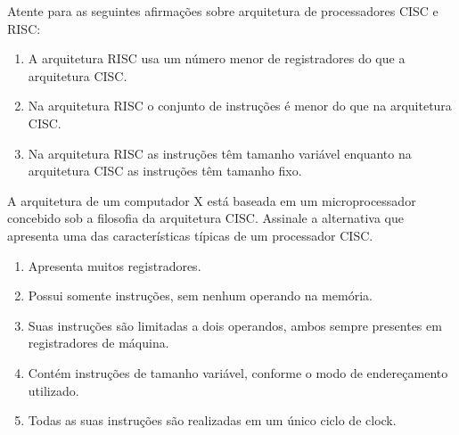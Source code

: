 \documentclass[aspectratio=169,
				xcolor=table]{beamer}
\begin{document}
	\begin{frame}
			Atente para as seguintes afirmações sobre arquitetura de processadores CISC e RISC:
			
			\vspace{1em}
			\begin{enumerate}[I]
				\item A arquitetura RISC usa um número menor de registradores do que a arquitetura CISC.
			
				\item Na arquitetura RISC o conjunto de instruções é menor do que na arquitetura CISC.
			
				\item Na arquitetura RISC as instruções têm tamanho variável enquanto na arquitetura CISC as instruções têm tamanho fixo.
			
			\end{enumerate}

	\end{frame}

	\begin{frame}
		A arquitetura de um computador X está baseada em um microprocessador concebido sob a filosofia da arquitetura CISC. 
Assinale a alternativa que apresenta uma das características típicas de um processador CISC.

	\vspace{1em}
	\begin{enumerate}[a]
	\normalsize
		\item Apresenta muitos registradores.
		\item Possui somente instruções, sem nenhum operando na memória.
		\item Suas instruções são limitadas a dois operandos, ambos sempre presentes em registradores de máquina. 
		\item Contém instruções de tamanho variável, conforme o modo de endereçamento utilizado.
		\item Todas as suas instruções são realizadas em um único ciclo de clock.	
	\end{enumerate}

	\end{frame}
	
\end{document}
